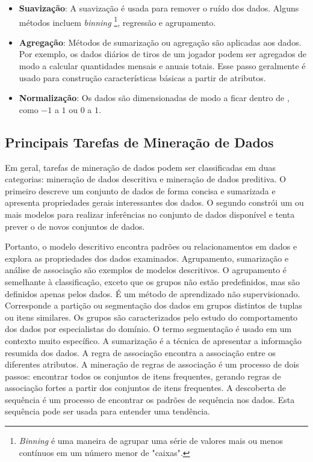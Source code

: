\begin{itemize}
  \item 
  \textbf{Suavização}: A suavização é usada para remover o ruído dos dados. Alguns métodos incluem \textit{binning} \footnote{\textit{Binning} é uma maneira de agrupar uma série de valores mais ou menos contínuos em um número menor de "caixas".}, regressão e agrupamento.
  \item
\textbf{Agregação}: Métodos de sumarização ou agregação são aplicadas aos dados. Por exemplo, os dados diários de tiros de um jogador podem ser agregados de modo a calcular quantidades mensais e anuais totais. Esse passo geralmente é usado para  construção características básicas a partir de atributos.
  \item 
\textbf{Normalização}: Os dados são dimensionadas de modo a ficar dentro de , como $-1$ a $1$ ou $0$ a $1$.
\end{itemize}

\subsection{Principais Tarefas de Mineração de Dados}
Em geral, tarefas de mineração de dados podem ser classificadas em duas categorias: mineração de dados descritiva e mineração de dados preditiva. O primeiro descreve um conjunto de dados de forma concisa e sumarizada e apresenta propriedades gerais interessantes dos dados. O segundo constrói um ou mais modelos para realizar inferências no conjunto de dados disponível e tenta prever o  de novos conjuntos de dados.

Portanto, o modelo descritivo encontra padrões ou relacionamentos em dados e explora as propriedades dos dados examinados. Agrupamento, sumarização e análise de associação são exemplos de modelos descritivos. O agrupamento é semelhante à classificação, exceto que os grupos não estão predefinidos, mas são definidos apenas pelos dados. É um método de aprendizado não supervisionado. Corresponde a partição ou segmentação dos dados em grupos distintos de tuplas ou itens similares. Os grupos são caracterizados pelo estudo do comportamento dos dados por especialistas do domínio. O termo segmentação é usado em um contexto muito específico. A sumarização é a técnica de apresentar a informação resumida dos dados. A regra de associação encontra a associação entre os diferentes atributos. A mineração de regras de associação é um processo de dois passos: encontrar todos os conjuntos de itens frequentes, gerando regras de associação fortes a partir dos conjuntos de itens frequentes. A descoberta de sequência é um processo de encontrar os padrões de sequência nos dados. Esta sequência pode ser usada para entender uma tendência.

